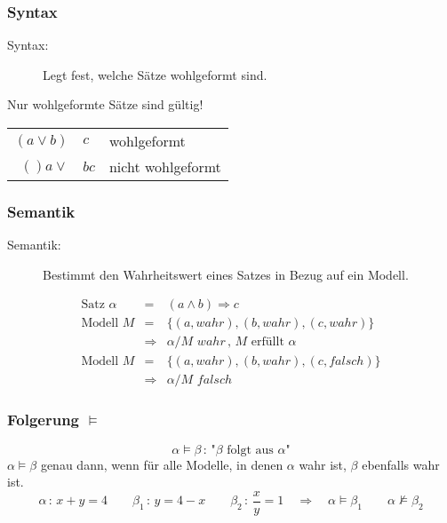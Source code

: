 \subsubsection*{Syntax}

\begin{description}
\item[Syntax:] Legt fest, welche Sätze wohlgeformt sind.
\end{description}
Nur wohlgeformte Sätze sind gültig!
\begin{center}
\begin{tabular}{|r @{$\, \Rightarrow \,$}l @{\quad} l|}
\hline
$(a \vee b)$ & $c$ & wohlgeformt \\
$()a \vee$ & $bc$ & nicht wohlgeformt \\ \hline
\end{tabular}
\end{center}

\subsubsection*{Semantik}

\begin{description}
\item[Semantik:] Bestimmt den Wahrheitswert eines Satzes in Bezug auf ein Modell.
\end{description}
\begin{eqnarray*}
\textrm{Satz } \alpha &=& (a \wedge b) \Rightarrow c \\ \textrm{Modell } M &=& \{ (a,wahr) , (b,wahr) , (c,wahr) \} \\ &\Rightarrow& \alpha / M \,\, wahr \, , \, M \textrm{ erfüllt } \alpha \\
\textrm{Modell } M &=& \{ (a,wahr) , (b,wahr) , (c,falsch) \} \\ &\Rightarrow& \alpha / M \,\, falsch
\end{eqnarray*}

\subsubsection*{Folgerung $\models$}

$$\alpha \models \beta \, : \, \textrm{"{}} \beta \textrm{ folgt aus } \alpha \textrm{"{}}$$
$\alpha \models \beta$ genau dann, wenn für alle Modelle, in denen $\alpha$ wahr ist, $\beta$ ebenfalls wahr ist.
$$\alpha \, : \, x+y=4 \qquad \beta_1 \, : \, y = 4-x \qquad \beta_2 \, : \, \frac{x}{y} = 1 \quad \Rightarrow \quad \alpha \models \beta_1 \qquad \alpha \not\models \beta_2$$

